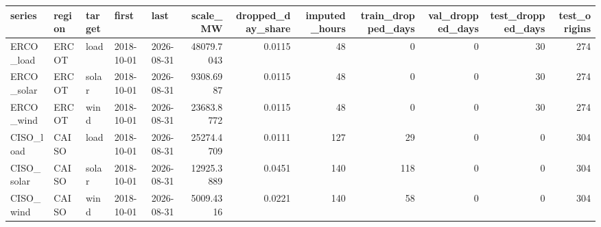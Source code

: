 \begin{tabular}{lllllrrrrrrr}
\toprule
series & region & target & first & last & scale_MW & dropped_day_share & imputed_hours & train_dropped_days & val_dropped_days & test_dropped_days & test_origins \\
\midrule
ERCO_load & ERCOT & load & 2018-10-01 & 2026-08-31 & 48079.7043 & 0.0115 & 48 & 0 & 0 & 30 & 274 \\
ERCO_solar & ERCOT & solar & 2018-10-01 & 2026-08-31 & 9308.6987 & 0.0115 & 48 & 0 & 0 & 30 & 274 \\
ERCO_wind & ERCOT & wind & 2018-10-01 & 2026-08-31 & 23683.8772 & 0.0115 & 48 & 0 & 0 & 30 & 274 \\
CISO_load & CAISO & load & 2018-10-01 & 2026-08-31 & 25274.4709 & 0.0111 & 127 & 29 & 0 & 0 & 304 \\
CISO_solar & CAISO & solar & 2018-10-01 & 2026-08-31 & 12925.3889 & 0.0451 & 140 & 118 & 0 & 0 & 304 \\
CISO_wind & CAISO & wind & 2018-10-01 & 2026-08-31 & 5009.4316 & 0.0221 & 140 & 58 & 0 & 0 & 304 \\
\bottomrule
\end{tabular}
